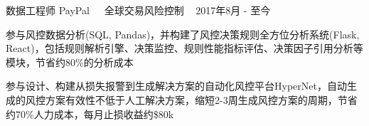 \documentclass[11pt, a4paper, UTF8]{awesome-cv}
\begin{document}
%
\begin{cventries}
  \cventry
    {数据工程师} %
    {PayPal{\ \cdotp\ \ }全球交易风险控制} %
    {\ } %
    {2017年8月 - 至今} %
    {
      \begin{cvitems} %
        \item {参与风控数据分析(SQL, Pandas)，并构建了风控决策规则全方位分析系统(Flask, React)，包括规则解析引擎、决策监控、规则性能指标评估、决策因子引用分析等模块，节省约80\%的分析成本}
        \item {参与设计、构建从损失报警到生成解决方案的自动化风控平台HyperNet，自动生成的风控方案有效性不低于人工解决方案，缩短2-3周生成风控方案的周期，节省约70\%人力成本，每月止损收益约\$80k}
      \end{cvitems}
    }
    

\end{cventries}
\end{document}
